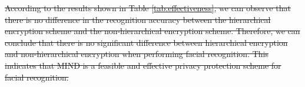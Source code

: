 ﻿\documentclass[conference]{IEEEtran}
\providecommand{\DIFdeltex}[1]{{\protect\color{red}\sout{#1}}}                      %
\providecommand{\DIFdelbegin}{} %
\providecommand{\DIFdelend}{} %
\providecommand{\DIFdel}[1]{\texorpdfstring{\DIFdeltex{#1}}{}} %
\newcommand{\DIFscaledelfig}{0.5}
\newlength{\DIFdelgraphicswidth} %
\newlength{\DIFdelgraphicsheight} %
\newcommand{\DIFdelincludegraphics}[2][]{%
\sbox{\DIFdelgraphicsbox}{\DIFOincludegraphics[#1]{#2}}%
\settoboxwidth{\DIFdelgraphicswidth}{\DIFdelgraphicsbox} %
\settoboxtotalheight{\DIFdelgraphicsheight}{\DIFdelgraphicsbox} %
\scalebox{\DIFscaledelfig}{%
\parbox[b]{\DIFdelgraphicswidth}{\usebox{\DIFdelgraphicsbox}\\[-\baselineskip] \rule{\DIFdelgraphicswidth}{0em}}\llap{\resizebox{\DIFdelgraphicswidth}{\DIFdelgraphicsheight}{%
\setlength{\unitlength}{\DIFdelgraphicswidth}%
\begin{picture}(1,1)%
\thicklines\linethickness{2pt} %
{\color[rgb]{1,0,0}\put(0,0){\framebox(1,1){}}}%
{\color[rgb]{1,0,0}\put(0,0){\line( 1,1){1}}}%
{\color[rgb]{1,0,0}\put(0,1){\line(1,-1){1}}}%
\end{picture}%
}\hspace*{3pt}}} %
} %
\DeclareRobustCommand{\DIFdelbegin}{\DIFOdelbegin \let\includegraphics\DIFdelincludegraphics} %
\DeclareRobustCommand{\DIFdelend}{\DIFOaddend \let\includegraphics\DIFOincludegraphics} %
\begin{document}
\DIFdelbegin \DIFdel{According to the results shown in Table \ref{tab:effectiveness}, we can observe that there is no difference in the recognition accuracy between the hierarchical encryption scheme and the non-hierarchical encryption scheme. Therefore, we can conclude that there is no significant difference between hierarchical encryption and non-hierarchical encryption when performing facial recognition. This indicates that MIND is a feasible and effective privacy protection scheme for facial recognition. }\DIFdelend %
\end{document}
